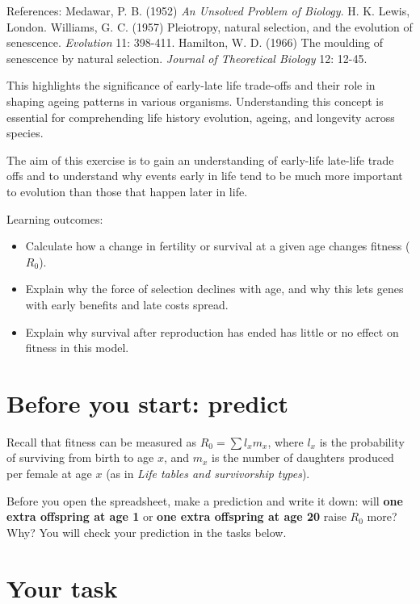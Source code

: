 \documentclass[
  a4paper]{book}
\providecommand{\tightlist}{%
  \setlength{\itemsep}{0pt}\setlength{\parskip}{0pt}}
\begin{document}
References: Medawar, P. B. (1952) \emph{An Unsolved Problem of Biology}. H. K. Lewis, London. Williams, G. C. (1957) Pleiotropy, natural selection, and the evolution of senescence. \emph{Evolution} 11: 398-411. Hamilton, W. D. (1966) The moulding of senescence by natural selection. \emph{Journal of Theoretical Biology} 12: 12-45.

This highlights the significance of early-late life trade-offs and their role in shaping ageing patterns in various organisms. Understanding this concept is essential for comprehending life history evolution, ageing, and longevity across species.

The aim of this exercise is to gain an understanding of early-life late-life trade offs and to understand why events early in life tend to be much more important to evolution than those that happen later in life.

Learning outcomes:

\begin{itemize}
\tightlist
\item
  Calculate how a change in fertility or survival at a given age changes fitness (\(R_0\)).
\item
  Explain why the force of selection declines with age, and why this lets genes with early benefits and late costs spread.
\item
  Explain why survival after reproduction has ended has little or no effect on fitness in this model.
\end{itemize}

\section{Before you start: predict}\label{before-you-start-predict-1}

Recall that fitness can be measured as \(R_0 = \sum l_x m_x\), where \(l_x\) is the probability of surviving from birth to age \(x\), and \(m_x\) is the number of daughters produced per female at age \(x\) (as in \emph{Life tables and survivorship types}).

Before you open the spreadsheet, make a prediction and write it down: will \textbf{one extra offspring at age 1} or \textbf{one extra offspring at age 20} raise \(R_0\) more? Why? You will check your prediction in the tasks below.

\section{Your task}\label{your-task-12}
\end{document}
